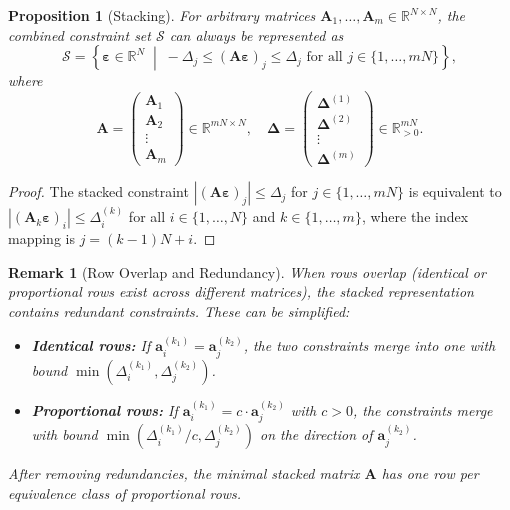 \documentclass{article}
\newtheorem{proposition}{Proposition}
\newtheorem{remark}{Remark}
\begin{document}
\begin{proposition}[Stacking]
\label{prop:stacking}
For arbitrary matrices $\mathbf{A}_1, \ldots, \mathbf{A}_m \in \mathbb{R}^{N \times N}$, the combined constraint set $\mathcal{S}$ can always be represented as
\begin{equation}
    \mathcal{S} = \left\{ \boldsymbol{\varepsilon} \in \mathbb{R}^N \;\middle|\; -\Delta_j \leq (\mathbf{A} \boldsymbol{\varepsilon})_j \leq \Delta_j \text{ for all } j \in \{1, \ldots, mN\} \right\},
\end{equation}
where
\begin{equation}
    \mathbf{A} = \begin{pmatrix} \mathbf{A}_1 \\ \mathbf{A}_2 \\ \vdots \\ \mathbf{A}_m \end{pmatrix} \in \mathbb{R}^{mN \times N}, \quad
    \boldsymbol{\Delta} = \begin{pmatrix} \boldsymbol{\Delta}^{(1)} \\ \boldsymbol{\Delta}^{(2)} \\ \vdots \\ \boldsymbol{\Delta}^{(m)} \end{pmatrix} \in \mathbb{R}^{mN}_{>0}.
\end{equation}
\end{proposition}

\begin{proof}
The stacked constraint $|(\mathbf{A} \boldsymbol{\varepsilon})_j| \leq \Delta_j$ for $j \in \{1, \ldots, mN\}$ is equivalent to $|(\mathbf{A}_k \boldsymbol{\varepsilon})_i| \leq \Delta_i^{(k)}$ for all $i \in \{1, \ldots, N\}$ and $k \in \{1, \ldots, m\}$, where the index mapping is $j = (k-1)N + i$.
\end{proof}

\begin{remark}[Row Overlap and Redundancy]
When rows overlap (identical or proportional rows exist across different matrices), the stacked representation contains redundant constraints. These can be simplified:
\begin{itemize}
    \item \textbf{Identical rows:} If $\mathbf{a}_i^{(k_1)} = \mathbf{a}_j^{(k_2)}$, the two constraints merge into one with bound $\min(\Delta_i^{(k_1)}, \Delta_j^{(k_2)})$.
    \item \textbf{Proportional rows:} If $\mathbf{a}_i^{(k_1)} = c \cdot \mathbf{a}_j^{(k_2)}$ with $c > 0$, the constraints merge with bound $\min(\Delta_i^{(k_1)}/c, \Delta_j^{(k_2)})$ on the direction of $\mathbf{a}_j^{(k_2)}$.
\end{itemize}
After removing redundancies, the minimal stacked matrix $\mathbf{A}$ has one row per equivalence class of proportional rows.
\end{remark}
\end{document}
